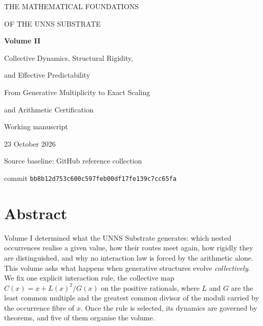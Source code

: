 
\frontmatter
\begin{titlepage}
\centering
\vspace*{26mm}
{\Large THE MATHEMATICAL FOUNDATIONS\par}
\vspace{4mm}
{\Large OF THE UNNS SUBSTRATE\par}
\vspace{15mm}
{\Huge\bfseries Volume II\par}
\vspace{5mm}
{\LARGE Collective Dynamics, Structural Rigidity,\par and Effective Predictability\par}
\vspace{10mm}
{\large From Generative Multiplicity to Exact Scaling\par and Arithmetic Certification\par}
\vfill
{\large Working manuscript\par}
{\large 23 October 2026\par}
\vspace{6mm}
{\normalsize Source baseline: GitHub reference collection\par commit \texttt{bb8b12d753c600c597feb00df17fe139c7cc65fa}\par}
\end{titlepage}

\chapter*{Abstract}
Volume I determined what the UNNS Substrate generates: which nested occurrences realise a given value, how their routes meet again, how rigidly they are distinguished, and why no interaction law is forced by the arithmetic alone. This volume asks what happens when generative structures evolve \emph{collectively}. We fix one explicit interaction rule, the collective map \(C(x)=x+L(x)^2/G(x)\) on the positive rationals, where \(L\) and \(G\) are the least common multiple and the greatest common divisor of the moduli carried by the occurrence fibre of \(x\). Once the rule is selected, its dynamics are governed by theorems, and five of them organise the volume.

